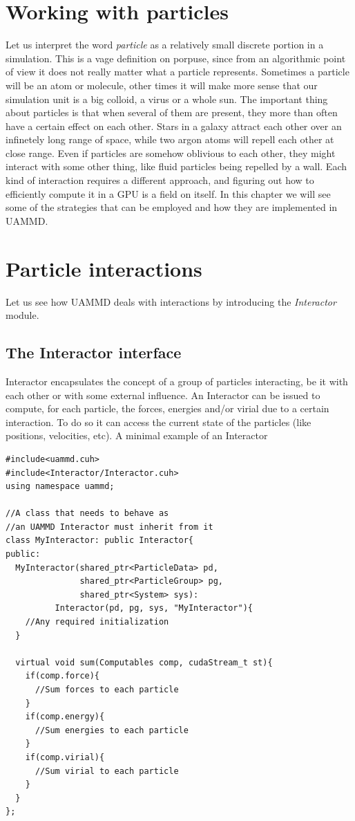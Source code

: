 \documentclass[ twoside,openright,titlepage,numbers=noenddot,%
headinclude,footinclude,cleardoublepage=empty,abstract=on,
BCOR=5mm,paper=a4,fontsize=11pt, dvipsnames
]{scrreprt}
\def\ucpp{uammd_cpp_lexer.py:UAMMDCppLexer -x}
\newcommand{\uammd}{\gls{UAMMD}\xspace}
\newcommand{\gpu}{\gls{GPU}\xspace}
\begin{document}
\chapter{Working with particles}
Let us interpret the word \emph{particle} as a relatively small discrete portion in a simulation. This is a vage definition on porpuse, since from an algorithmic point of view it does not really matter what a particle represents. Sometimes a particle will be an atom or molecule, other times it will make more sense that our simulation unit is a big colloid, a virus or a whole sun.
The important thing about particles is that when several of them are present, they more than often have a certain effect on each other.
Stars in a galaxy attract each other over an infinetely long range of space, while two argon atoms will repell each other at close range.
Even if particles are somehow oblivious to each other, they might interact with some other thing, like fluid particles being repelled by a wall.
Each kind of interaction requires a different approach, and figuring out how to efficiently compute it in a \gpu is a field on itself. 
In this chapter we will see some of the strategies that can be employed and how they are implemented in \uammd.

\chapter{Particle interactions}


Let us see how \uammd deals with interactions by introducing the \emph{Interactor} module.

\section{The Interactor interface} \label{sec:interactor}

Interactor encapsulates the concept of a group of particles interacting, be it with each other or with some external influence.
An Interactor can be issued to compute, for each particle, the forces, energies and/or virial due to a certain interaction.
To do so it can access the current state of the particles (like positions, velocities, etc).
A minimal example of an Interactor

\begin{verbatim}
#include<uammd.cuh>
#include<Interactor/Interactor.cuh>
using namespace uammd;

//A class that needs to behave as 
//an UAMMD Interactor must inherit from it
class MyInteractor: public Interactor{
public:
  MyInteractor(shared_ptr<ParticleData> pd,
               shared_ptr<ParticleGroup> pg,
               shared_ptr<System> sys):
          Interactor(pd, pg, sys, "MyInteractor"){
    //Any required initialization 
  }

  virtual void sum(Computables comp, cudaStream_t st){
    if(comp.force){
      //Sum forces to each particle
    }
    if(comp.energy){
      //Sum energies to each particle
    }
    if(comp.virial){
      //Sum virial to each particle
    }
  }
};
\end{verbatim}
\end{document}
